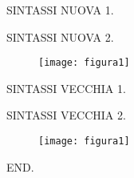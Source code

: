 \documentclass[a4paper]{article}
\begin{document}
\beginnumbering \pstart\Unit SINTASSI NUOVA 1. \pend
\pausenumbering
\begin{figure}[h]
\centering
{}

\end{figure}
\resumenumbering
 \pstart\Unit SINTASSI NUOVA 2. \pend
\pausenumbering
\begin{figure}[h]
\centering

\texttt{[image: figura1]}
\end{figure}
\resumenumbering

\pstart\Unit SINTASSI VECCHIA 1. \pend
\pausenumbering
\begin{figure}[h]
\centering
{}

\end{figure}
\resumenumbering
 \pstart\Unit SINTASSI VECCHIA 2. \pend
\pausenumbering
\begin{figure}[h]
\centering

\texttt{[image: figura1]}
\end{figure}
\resumenumbering
 \pstart\Unit
END. \pend\clearpage

\endnumbering
\end{document}
